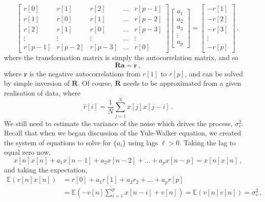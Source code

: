 \begin{displaymath}
  \left[\begin{array}{ccccc}
      r[0] & r[1] & r[2] & \hdots & r[p-1] \\
      r[1] & r[0] & r[1] & \hdots & r[p-2] \\
      r[2] & r[1] & r[0] & \hdots & r[p-3] \\
      \vdots & \vdots & \vdots & \hdots & \vdots \\
      r[p-1] & r[p-2] & r[p-3] & \hdots & r[0]
    \end{array}\right]
  \left[\begin{array}{c}
      a_1 \\ a_2 \\ a_3 \\ \vdots \\ a_p
    \end{array}\right] =
  \left[\begin{array}{c}
      -r[1] \\ -r[2] \\ -r[3] \\ \vdots \\ -r[p]
    \end{array}\right] \,,
\end{displaymath}
%
where the transformation matrix is simply the autocorrelation matrix,
and so
%
\begin{displaymath}
  \mathbf{Ra} = \mathbf{r} \,,
\end{displaymath}
%
where $\mathbf{r}$ is the negative autocorrelations from $r[1]$ to
$r[p]$, and can be solved by simple inversion of $\mathbf{R}$. Of course,
$\mathbf{R}$ needs to be approximated from a given realisation of data,
where
%
\begin{displaymath}
  \hat{r}[i] = \frac{1}{N}\sum_{j=1}^N x[j]x[j-i] \,.
\end{displaymath}
%
We still need to estimate the variance of the noise which drives the
process, $\sigma_v^2$. Recall that when we began discussion of the
Yule-Walker equation, we created the system of equations to solve for
$\{a_i\}$ using lags $\ell > 0$. Taking the lag to equal zero now,
%
\begin{displaymath}
  x[n]x[n] + a_1x[n-1] + a_2x[n-2] + \hdots + a_px[n-p] = x[n]x[n] \,,
\end{displaymath}
%
and taking the expectation,
%
\begin{align*}
  \mathbb{E}(v[n]x[n]) &= r[0] + a_1r[1] + a_2r_2 + \hdots + a_pr[p] \\ 
  &= \mathbb{E}\left(-v[n]\sum_{i=1}^px[n-i] + v[n]\right)
  = \mathbb{E}(v[n]v[n]) = \sigma_v^2 \,,
\end{align*}
